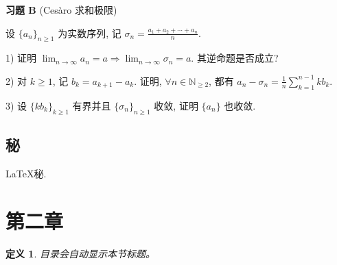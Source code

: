 \documentclass[12pt,a4paper,fontset=none]{ctexart}
\newcounter{theorem_counter}
\theoremstyle{bluehead}
\newtheorem{definition}{定义}[subsection]
\theoremstyle{redhead}
\begin{document}
\hspace{-2em} \textbf{习题 B} (Cesàro 求和极限)

\vspace{0.2cm}

设 $\{a_n\}_{n \ge 1}$ 为实数序列, 记 $\displaystyle \sigma_n=\frac{a_1+a_2+\cdots +a_n}{n}$.

\vspace{0.2cm}

\hspace{-2em} 1) 证明 $\displaystyle \lim_{n \to \infty} a_n=a \Rightarrow \displaystyle \lim_{n \to \infty} \sigma_n=a$. 其逆命题是否成立?

\hspace{-2em} 2) 对 $k \ge 1$, 记 $b_k=a_{k+1}-a_{k}$. 证明, $\forall n \in \mathbb{N}_{\ge 2}$, 都有 $\displaystyle a_n-\sigma_n=\frac{1}{n}\sum_{k=1}^{n-1}kb_k$.

\hspace{-2em} 3) 设 $\{kb_k\}_{k \ge 1}$ 有界并且 $\{\sigma_{n}\}_{n \ge 1}$ 收敛, 证明 $\{a_n\}$ 也收敛.


\subsection{秘}

\LaTeX 秘.

\newpage

\section{第二章}

\begin{definition}
目录会自动显示本节标题。
\end{definition}
\end{document}
